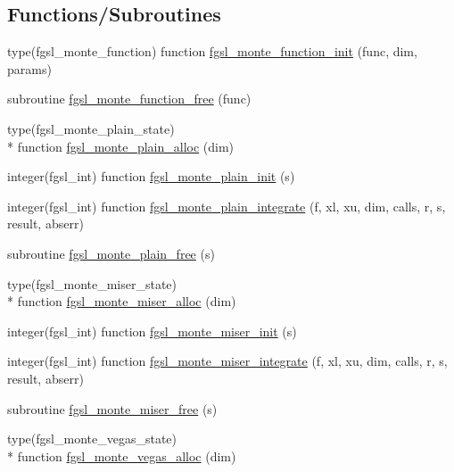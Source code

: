 \subsection*{Functions/\-Subroutines}
\begin{DoxyCompactItemize}
\item 
type(fgsl\-\_\-monte\-\_\-function) function \hyperlink{montecarlo_8finc_a15f091a9199b5feb5a89e48b523fec5e}{fgsl\-\_\-monte\-\_\-function\-\_\-init} (func, dim, params)
\item 
subroutine \hyperlink{montecarlo_8finc_a1cebacdc85ce175202a13211f5bc5d51}{fgsl\-\_\-monte\-\_\-function\-\_\-free} (func)
\item 
type(fgsl\-\_\-monte\-\_\-plain\-\_\-state) \\*
function \hyperlink{montecarlo_8finc_a78d51cf421999fedc5d8ea880fd5b010}{fgsl\-\_\-monte\-\_\-plain\-\_\-alloc} (dim)
\item 
integer(fgsl\-\_\-int) function \hyperlink{montecarlo_8finc_aa8dce2c1b9acbf0d5ad973b6a9fcb52c}{fgsl\-\_\-monte\-\_\-plain\-\_\-init} (s)
\item 
integer(fgsl\-\_\-int) function \hyperlink{montecarlo_8finc_a055f2d0383f12a1ec343e0e6389e7aac}{fgsl\-\_\-monte\-\_\-plain\-\_\-integrate} (f, xl, xu, dim, calls, r, s, result, abserr)
\item 
subroutine \hyperlink{montecarlo_8finc_ae8b9533f16107ce4fa773962d95ba21c}{fgsl\-\_\-monte\-\_\-plain\-\_\-free} (s)
\item 
type(fgsl\-\_\-monte\-\_\-miser\-\_\-state) \\*
function \hyperlink{montecarlo_8finc_a8cc7ef76d9ac9d08b0fd80d0956e53f4}{fgsl\-\_\-monte\-\_\-miser\-\_\-alloc} (dim)
\item 
integer(fgsl\-\_\-int) function \hyperlink{montecarlo_8finc_ab005757b4f0e3f08eb0595920d166393}{fgsl\-\_\-monte\-\_\-miser\-\_\-init} (s)
\item 
integer(fgsl\-\_\-int) function \hyperlink{montecarlo_8finc_aef41da72b6c8bd738bf13aa19ec02bd1}{fgsl\-\_\-monte\-\_\-miser\-\_\-integrate} (f, xl, xu, dim, calls, r, s, result, abserr)
\item 
subroutine \hyperlink{montecarlo_8finc_a3cf77f03d4317c892a8ca6045580aa2b}{fgsl\-\_\-monte\-\_\-miser\-\_\-free} (s)
\item 
type(fgsl\-\_\-monte\-\_\-vegas\-\_\-state) \\*
function \hyperlink{montecarlo_8finc_a104c37829cabd4b2c65dc53b4d428dad}{fgsl\-\_\-monte\-\_\-vegas\-\_\-alloc} (dim)
\item 

\end{DoxyCompactItemize}
